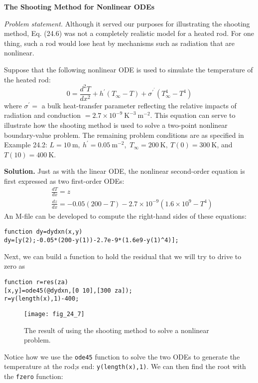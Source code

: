 \documentclass[../main.tex]{subfiles}
\begin{document}
\begin{exmp}
    \textbf{The Shooting Method for Nonlinear ODEs}

    \noindent\textit{Problem statement.} Although it served our purposes for illustrating the shooting method, Eq. (24.6) was not a completely realistic model for a heated rod. For one thing, such a rod would lose heat by mechanisms such as radiation that are nonlinear.

    Suppose that the following nonlinear ODE is used to simulate the temperature of the heated rod:
    $$
    0=\frac{d^{2} T}{d x^{2}}+h^{\prime}\left(T_{\infty}-T\right)+\sigma^{\prime^{\prime}}\left(T_{\infty}^{4}-T^{4}\right)
    $$
    where $\sigma^{\prime}=$ a bulk heat-transfer parameter reflecting the relative impacts of radiation and conduction $=2.7 \times 10^{-9} \mathrm{~K}^{-3} \mathrm{~m}^{-2}$. This equation can serve to illustrate how the shooting method is used to solve a two-point nonlinear boundary-value problem. The remaining problem conditions are as specified in Example 24.2: $L=10 \mathrm{~m},\ h^{\prime}=0.05 \mathrm{~m}^{-2}$,\ $T_{\infty}=200 \mathrm{~K},\ T(0)=300 \mathrm{~K}$, and $T(10)=400 \mathrm{~K}$.
    
    \noindent\textbf{Solution.} Just as with the linear ODE, the nonlinear second-order equation is first expressed as two first-order ODEs:
    $$
    \begin{aligned}
    &\frac{d T}{d x}=z \\
    &\frac{d z}{d x}=-0.05(200-T)-2.7 \times 10^{-9}\left(1.6 \times 10^{9}-T^{4}\right)
    \end{aligned}
    $$
    An M-file can be developed to compute the right-hand sides of these equations:\vspace*{\smallskipamount}

    \noindent\texttt{function dy=dydxn(x,y)\\
    dy=[y(2);-0.05*(200-y(1))-2.7e-9*(1.6e9-y(1)\^{}4)];}\vspace*{\smallskipamount}

    \noindent Next, we can build a function to hold the residual that we will try to drive to zero as\vspace*{\smallskipamount}

    \noindent\texttt{function r=res(za)}\\
    \texttt{[x,y]=ode45(@dydxn,[0 10],[300 za]);\\
    r=y(length(x),1)-400;}

    \begin{figure}[H]
        \centering
        \texttt{[image: fig\_24\_7]}
       \caption{\textsf{The result of using the shooting method to solve a nonlinear problem.}}\label{fig:fig_24_7}
    \end{figure}
    \noindent Notice how we use the \texttt{ode45} function to solve the two ODEs to generate the temperature
    at the rod;s end: \texttt{y(length(x),1)}. We can then find the root with the \texttt{fzero} function:


\end{exmp}
\end{document}
